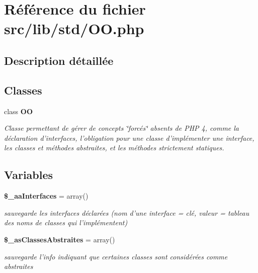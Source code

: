 \section{Référence du fichier src/lib/std/OO.php}
\label{_o_o_8php}


\subsection{Description détaillée}


\subsection*{Classes}
\begin{CompactItemize}
\item 
class {\bf OO}
\begin{CompactList}\small\item\em Classe permettant de gérer de concepts \char`\"{}forcés\char`\"{} absents de PHP 4, comme la déclaration d'interfaces, l'obligation pour une classe d'implémenter une interface, les classes et méthodes abstraites, et les méthodes strictement statiques. \item\end{CompactList}\end{CompactItemize}
\subsection*{Variables}
\begin{CompactItemize}
\item 
{\bf \$\_\-aaInterfaces} = array()\label{_o_o_8php_47719b4fd29fc609a19a39290ccf2e1e}

\begin{CompactList}\small\item\em sauvegarde les interfaces déclarées (nom d'une interface = clé, valeur = tableau des noms de classes qui l'implémentent) \item\end{CompactList}\item 
{\bf \$\_\-asClassesAbstraites} = array()\label{_o_o_8php_28354bb5a1931bc0682ff1be103848e7}

\begin{CompactList}\small\item\em sauvegarde l'info indiquant que certaines classes sont considérées comme abstraites \item\end{CompactList}\end{CompactItemize}
